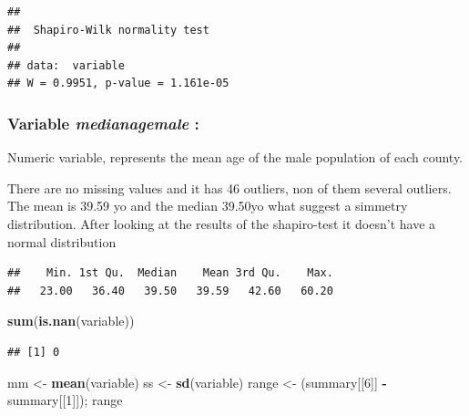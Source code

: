 \documentclass[
]{article}
\newenvironment{Shaded}{\begin{snugshade}}{\end{snugshade}}
\newcommand{\DecValTok}[1]{\textcolor[rgb]{0.00,0.00,0.81}{#1}}
\newcommand{\FunctionTok}[1]{\textcolor[rgb]{0.13,0.29,0.53}{\textbf{#1}}}
\newcommand{\NormalTok}[1]{#1}
\newcommand{\OtherTok}[1]{\textcolor[rgb]{0.56,0.35,0.01}{#1}}
\newcommand{\SpecialCharTok}[1]{\textcolor[rgb]{0.81,0.36,0.00}{\textbf{#1}}}
\begin{document}
\begin{verbatim}
## 
##  Shapiro-Wilk normality test
## 
## data:  variable
## W = 0.9951, p-value = 1.161e-05
\end{verbatim}

\subsubsection{\texorpdfstring{Variable \emph{medianagemale}
:}{Variable medianagemale :}}\label{variable-medianagemale}

Numeric variable, represents the mean age of the male population of each
county.

There are no missing values and it has 46 outliers, non of them several
outliers. The mean is 39.59 yo and the median 39.50yo what suggest a
simmetry distribution. After looking at the results of the shapiro-test
it doesn't have a normal distribution

\begin{Shaded}
\end{Shaded}

\begin{verbatim}
##    Min. 1st Qu.  Median    Mean 3rd Qu.    Max. 
##   23.00   36.40   39.50   39.59   42.60   60.20
\end{verbatim}

\begin{Shaded}
\begin{Highlighting}[]
\FunctionTok{sum}\NormalTok{(}\FunctionTok{is.nan}\NormalTok{(variable))}
\end{Highlighting}
\end{Shaded}

\begin{verbatim}
## [1] 0
\end{verbatim}

\begin{Shaded}
\begin{Highlighting}[]
\NormalTok{mm }\OtherTok{\textless{}{-}} \FunctionTok{mean}\NormalTok{(variable)}
\NormalTok{ss }\OtherTok{\textless{}{-}} \FunctionTok{sd}\NormalTok{(variable)}
\NormalTok{range }\OtherTok{\textless{}{-}}\NormalTok{ (summary[[}\DecValTok{6}\NormalTok{]] }\SpecialCharTok{{-}}\NormalTok{ summary[[}\DecValTok{1}\NormalTok{]]); range}
\end{Highlighting}
\end{Shaded}
\end{document}
